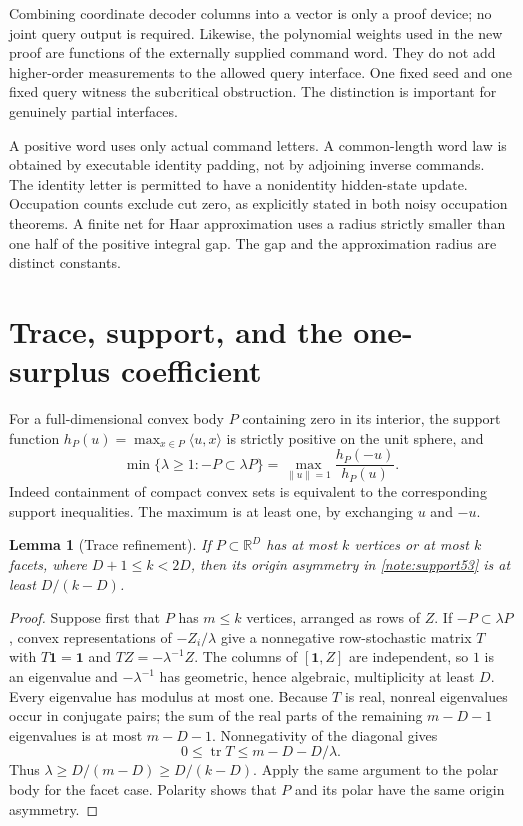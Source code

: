 \documentclass[11pt]{amsart}
\numberwithin{equation}{section}
\newtheorem{lemma}[proposition]{Lemma}
\newcommand{\R}{\mathbb R}
\newcommand{\norm}[1]{\lVert#1\rVert}
\DeclareMathOperator{\tr}{tr}
\begin{document}
Combining coordinate decoder columns into a vector is only a proof device; no joint query output is required. Likewise, the polynomial weights used in the new proof are functions of the externally supplied command word. They do not add higher-order measurements to the allowed query interface. One fixed seed and one fixed query witness the subcritical obstruction. The distinction is important for genuinely partial interfaces.

A positive word uses only actual command letters. A common-length word law is obtained by executable identity padding, not by adjoining inverse commands. The identity letter is permitted to have a nonidentity hidden-state update. Occupation counts exclude cut zero, as explicitly stated in both noisy occupation theorems. A finite net for Haar approximation uses a radius strictly smaller than one half of the positive integral gap. The gap and the approximation radius are distinct constants.

\section{Trace, support, and the one-surplus coefficient}
For a full-dimensional convex body $P$ containing zero in its interior, the support function $h_P(u)=\max_{x\in P}\langle u,x\rangle$ is strictly positive on the unit sphere, and
\begin{equation}\label{note:support53}
 \min\{\lambda\ge1:-P\subset\lambda P\}
       =\max_{\norm u=1}\frac{h_P(-u)}{h_P(u)}.
\end{equation}
Indeed containment of compact convex sets is equivalent to the corresponding support inequalities. The maximum is at least one, by exchanging $u$ and $-u$.

\begin{lemma}[Trace refinement]\label{note:trace53}
If $P\subset\R^D$ has at most $k$ vertices or at most $k$ facets, where $D+1\le k<2D$, then its origin asymmetry in \eqref{note:support53} is at least $D/(k-D)$.
\end{lemma}
\begin{proof}
Suppose first that $P$ has $m\le k$ vertices, arranged as rows of $Z$. If $-P\subset\lambda P$, convex representations of $-Z_i/\lambda$ give a nonnegative row-stochastic matrix $T$ with $T\mathbf1=\mathbf1$ and $TZ=-\lambda^{-1}Z$. The columns of $[\mathbf1,Z]$ are independent, so $1$ is an eigenvalue and $-\lambda^{-1}$ has geometric, hence algebraic, multiplicity at least $D$. Every eigenvalue has modulus at most one. Because $T$ is real, nonreal eigenvalues occur in conjugate pairs; the sum of the real parts of the remaining $m-D-1$ eigenvalues is at most $m-D-1$. Nonnegativity of the diagonal gives
\[
              0\le\tr T\le m-D-D/\lambda.
\]
Thus $\lambda\ge D/(m-D)\ge D/(k-D)$. Apply the same argument to the polar body for the facet case. Polarity shows that $P$ and its polar have the same origin asymmetry.
\end{proof}
\end{document}
